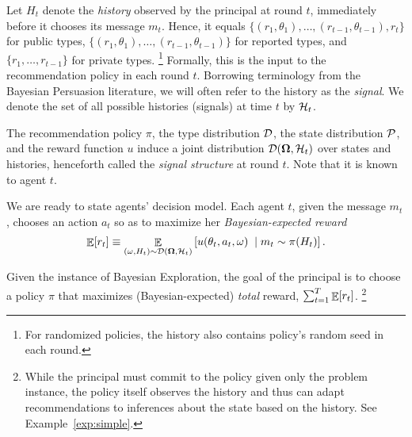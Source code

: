 

Let $H_t$ denote the \emph{history} observed by the principal at round $t$, immediately before it chooses its message $m_t$. Hence, it equals $\{(r_1,\theta_1),\ldots,(r_{t-1},\theta_{t-1}),r_t\}$ for public types, $\{(r_1,\theta_1),\ldots,(r_{t-1},\theta_{t-1})\}$ for reported types, and $\{r_1,\ldots,r_{t-1}\}$ for private types.%
\footnote{For randomized policies, the history also contains policy's random seed in each round.}
Formally, this is the input to the recommendation policy in each round $t$. Borrowing terminology from the Bayesian Persuasion literature, we will often refer to the history as the {\em signal}. We denote the set of all possible histories (signals) at time $t$ by $\mathcal{H}_t$.


The recommendation policy $\pi$, the type distribution $\mathcal{D}$, the state distribution $\mathcal{P}$, and the reward function $u$ induce a joint distribution $\mathcal{D}(\bold{\Omega},\mathcal{H}_t)$ over states and histories, henceforth called the {\em signal structure} at round $t$. Note that it is known to agent $t$.

We are ready to state agents' decision model. Each agent $t$, given the message $m_t$, chooses an action $a_t$ so as to maximize her {\em Bayesian-expected reward}
\begin{align}
 \mathop{\mathbb{E}}[r_t]\equiv
    \mathop{\mathbb{E}}_{(\omega,H_t)\sim\mathcal{D}(\bold{\Omega},\mathcal{H}_t)}
    \left[ 
        u(\theta_t,a_t,\omega)\; \mid m_t\sim\pi(H_t)
    \right].
\end{align}

Given the instance of Bayesian Exploration, the goal of the principal is to choose a policy $\pi$ that maximizes (Bayesian-expected) {\em total} reward, \ie $\sum_{t=1}^T \mathop{\mathbb{E}}[r_t]$. 
\footnote{While the principal must commit to the policy given only the problem instance, the policy itself observes the history and thus can adapt recommendations to inferences about the state based on the history.  See Example~\ref{exp:simple}.}

